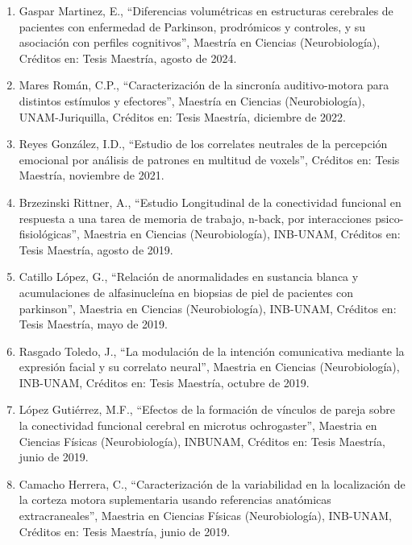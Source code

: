 \documentclass[12pt]{article}
\begin{document}
\begin{enumerate}
\item Gaspar Martinez, E., “Diferencias volumétricas en estructuras cerebrales de pacientes con enfermedad de Parkinson, prodrómicos y 
controles, y su asociación con perfiles cognitivos”, Maestría en Ciencias (Neurobiología), Créditos en: Tesis Maestría, agosto de 2024.

\item Mares Román, C.P., “Caracterización de la sincronía auditivo-motora para distintos estímulos y efectores”, Maestría en Ciencias 
(Neurobiología), UNAM-Juriquilla, Créditos en: Tesis Maestría, diciembre de 2022.

\item Reyes González, I.D., “Estudio de los correlates neutrales de la percepción emocional por análisis de patrones en multitud de 
voxels”, Créditos en: Tesis Maestría, noviembre de 2021.

\item Brzezinski Rittner, A., “Estudio Longitudinal de la conectividad funcional en respuesta a una tarea de memoria de trabajo, 
n-back, 
por interacciones psico-fisiológicas”, Maestria en Ciencias (Neurobiología), INB-UNAM, Créditos en: Tesis Maestría, agosto de 2019.

\item Catillo López, G., “Relación de anormalidades en sustancia blanca y acumulaciones de alfasinucleína en biopsias de piel de 
pacientes 
con parkinson”, Maestria en Ciencias (Neurobiología), INB-UNAM, Créditos en: Tesis Maestría, mayo de 2019.

\item Rasgado Toledo, J., “La modulación de la intención comunicativa mediante la expresión facial y su correlato neural”, Maestria en 
Ciencias (Neurobiología), INB-UNAM, Créditos en: Tesis Maestría, octubre de 2019.

\item López Gutiérrez, M.F., “Efectos de la formación de vínculos de pareja sobre la conectividad funcional cerebral en microtus 
ochrogaster”, Maestria en Ciencias Físicas (Neurobiología), INBUNAM, Créditos en: Tesis Maestría, junio de 2019.

\item Camacho Herrera, C., “Caracterización de la variabilidad en la localización de la corteza motora suplementaria usando referencias 
anatómicas extracraneales”, Maestria en Ciencias Físicas (Neurobiología), INB-UNAM, Créditos en: Tesis Maestría, junio de 2019.


\end{enumerate}
\end{document}

